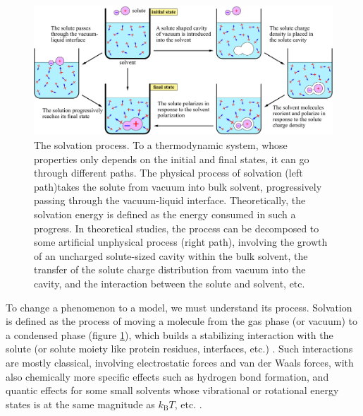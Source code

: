 \begin{figure}[h]
\centering{}\textcolor{red}{}%
\begin{minipage}[t]{1\textwidth}%
\begin{center}
\includegraphics[width=1\columnwidth]{_figure/solvation}\caption[The solvation process]{The solvation process.\label{fig:Process-of-solvation} To a thermodynamic
system, whose properties only depends on the initial and final states,
it can go through different paths. The physical process of solvation
(left path)takes the solute from vacuum into bulk solvent, progressively
passing through the vacuum-liquid interface. Theoretically, the solvation
energy is defined as the energy consumed in such a progress. In theoretical
studies, the process can be decomposed to some artificial unphysical
process (right path), involving the growth of an uncharged solute-sized
cavity within the bulk solvent, the transfer of the solute charge
distribution from vacuum into the cavity, and the interaction between
the solute and solvent, etc.}

\par\end{center}%
\end{minipage}
\end{figure}


To change a phenomenon to a model, we must understand its process.
Solvation is defined as the process of moving a molecule from the
gas phase (or vacuum) to a condensed phase (figure \ref{fig:Process-of-solvation}),
which builds a stabilizing interaction with the solute (or solute
moiety like protein residues, interfaces, etc.) \citep{iupac}. Such
interactions are mostly classical, involving electrostatic forces
and van der Waals forces, with also chemically more specific effects
such as hydrogen bond formation, and quantic effects for some small
solvents whose vibrational or rotational energy states is at the same
magnitude as $k_{\mathrm{B}}T$, etc. \citep{Gray-Gubbins}.

